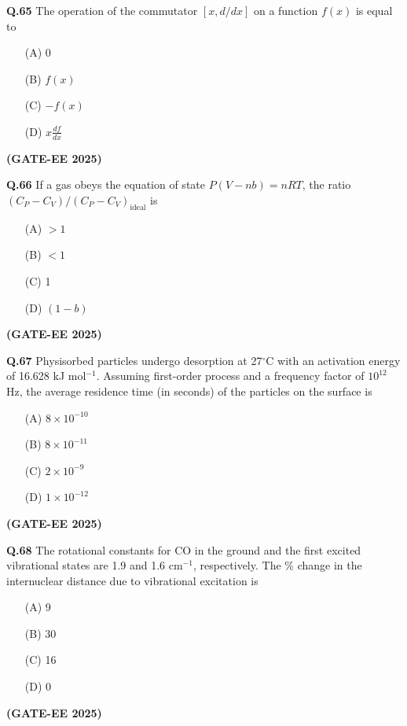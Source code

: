 \documentclass[12pt]{article}
\begin{document}
\begin{enumerate}
\vspace{0.5cm}

\textbf{Q.65} The operation of the commutator $[x, d/dx]$ on a function $f(x)$ is equal to

\begin{enumerate}
\item[(A)] 0
\item[(B)] $f(x)$
\item[(C)] $-f(x)$
\item[(D)] $x \frac{df}{dx}$
\end{enumerate}   \textbf{(GATE-EE 2025)}


\vspace{0.5cm}

\textbf{Q.66} If a gas obeys the equation of state $P (V - nb) = nRT$, the ratio $(C_P - C_V)/(C_P - C_V)_{\text{ideal}}$ is

\begin{enumerate}
\item[(A)] $> 1$
\item[(B)] $< 1$
\item[(C)] 1
\item[(D)] $(1 - b)$
\end{enumerate}   \textbf{(GATE-EE 2025)}


\vspace{0.5cm}

\textbf{Q.67} Physisorbed particles undergo desorption at 27$^\circ$C with an activation energy of 16.628 kJ mol$^{-1}$. Assuming first-order process and a frequency factor of $10^{12}$ Hz, the average residence time (in seconds) of the particles on the surface is

\begin{enumerate}
\item[(A)] $8 \times 10^{-10}$
\item[(B)] $8 \times 10^{-11}$
\item[(C)] $2 \times 10^{-9}$
\item[(D)] $1 \times 10^{-12}$
\end{enumerate}   \textbf{(GATE-EE 2025)}


\vspace{0.5cm}

\textbf{Q.68} The rotational constants for CO in the ground and the first excited vibrational states are 1.9 and 1.6 cm$^{-1}$, respectively. The \% change in the internuclear distance due to vibrational excitation is

\begin{enumerate}
\item[(A)] 9
\item[(B)] 30
\item[(C)] 16
\item[(D)] 0
\end{enumerate}   \textbf{(GATE-EE 2025)}



\end{enumerate}
\end{document}
